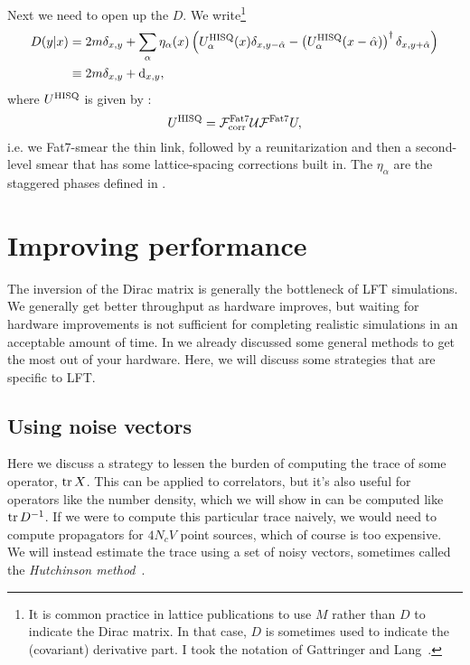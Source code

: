 Next we need to open up the $D$. We write\footnote{It is common practice in
lattice publications to use $M$ rather than $D$ to indicate the Dirac matrix.
In that case, $D$ is sometimes used to indicate the (covariant) derivative part.
I took the notation of Gattringer and Lang~\cite{gattringer_quantum_2010}.}
\begin{equation}\begin{aligned}
D(y|x)&=2m\delta_{x,y}
+\sum_\alpha \eta_\alpha(x)\left(U^{\rm HISQ}_\alpha(x)\delta_{x,y-\hat\alpha}
-\left(U^{\rm HISQ}_\alpha(x-\hat\alpha)\right)^\dagger\delta_{x,y+\hat\alpha}\right)\\
&\equiv 2m\delta_{x,y}+\dd_{x,y},
\end{aligned}\end{equation}
where $U^{\rm HISQ}$ is given by :
\begin{equation}
U^{\rm HISQ}=\mathcal{F}^{\rm Fat7}_{\rm corr}\mathcal{U}\mathcal{F}^{\rm Fat7}U,
\end{equation} 
i.e. we Fat7-smear the thin link, followed
by a reunitarization and then a second-level smear that has some lattice-spacing
corrections built in. The $\eta_\alpha$ are the
staggered phases defined in .



\section{Improving performance}

The inversion of the Dirac matrix is generally the bottleneck of LFT
simulations. We generally get better throughput as hardware improves, 
but waiting for hardware improvements is not sufficient for completing realistic
simulations in an acceptable amount of time. In  we
already discussed some general methods to get the most out of your hardware.
Here, we will discuss some strategies that are specific to LFT.

\subsection{Using noise vectors}\label{sec:noiseVector}

Here we discuss a strategy to lessen the burden of computing the trace of some
operator, $\tr X$. This can be applied to correlators, but it's also useful for
operators like the number density, which we will show in 
can be computed like $\tr D^{-1}$. 
If we were to compute this particular trace
naively, we would need to compute propagators for $4N_cV$ point sources,
which of course is too expensive.
We will instead estimate the trace using a set of
noisy vectors, sometimes called the {\it Hutchinson
method}~\cite{hutchinson_stochastic_1990}.


